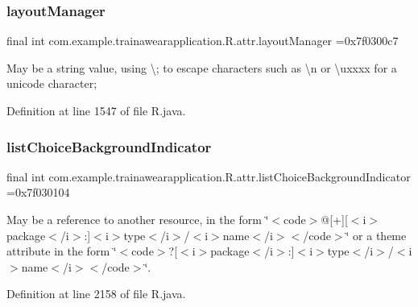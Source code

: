 \subsubsection{\texorpdfstring{layoutManager}{layoutManager}}
{\footnotesize\ttfamily final int com.\+example.\+trainawearapplication.\+R.\+attr.\+layout\+Manager =0x7f0300c7\hspace{0.3cm}{\ttfamily [static]}}

May be a string value, using \textquotesingle{}\textbackslash{};\textquotesingle{} to escape characters such as \textquotesingle{}\textbackslash{}n\textquotesingle{} or \textquotesingle{}\textbackslash{}uxxxx\textquotesingle{} for a unicode character; 

Definition at line 1547 of file R.\+java.

\mbox{\label{classcom_1_1example_1_1trainawearapplication_1_1_r_1_1attr_ab882a1b0a8a047b58a4e3b7ca2a4b4c6}} 
\subsubsection{\texorpdfstring{listChoiceBackgroundIndicator}{listChoiceBackgroundIndicator}}
{\footnotesize\ttfamily final int com.\+example.\+trainawearapplication.\+R.\+attr.\+list\+Choice\+Background\+Indicator =0x7f030104\hspace{0.3cm}{\ttfamily [static]}}

May be a reference to another resource, in the form \char`\"{}$<$code$>$@\mbox{[}+\mbox{]}\mbox{[}$<$i$>$package$<$/i$>$\+:\mbox{]}$<$i$>$type$<$/i$>$/$<$i$>$name$<$/i$>$$<$/code$>$\char`\"{} or a theme attribute in the form \char`\"{}$<$code$>$?\mbox{[}$<$i$>$package$<$/i$>$\+:\mbox{]}$<$i$>$type$<$/i$>$/$<$i$>$name$<$/i$>$$<$/code$>$\char`\"{}. 

Definition at line 2158 of file R.\+java.

\mbox{\label{classcom_1_1example_1_1trainawearapplication_1_1_r_1_1attr_a12e5a93ccd5f94529cbbd425a659f804}} 

